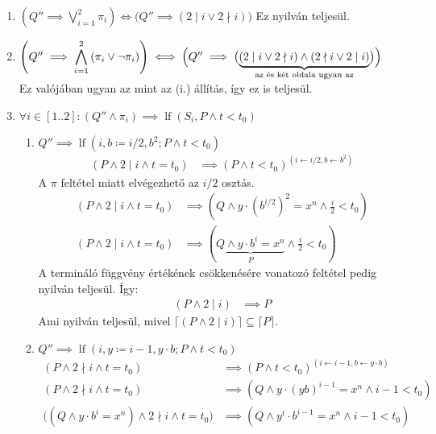 \documentclass[a4paper,12pt]{article}
\DeclareMathOperator{\lf}{lf}
\begin{document}
\begin{solution}
\begin{enumerate}
\begin{enumerate}
				\begin{enumerate}
					\item $ \left( Q'' \implies \displaystyle \bigvee_{i=1}^2{\pi_i} \right) \iff \bigl( Q'' \implies ( 2 \mid i \lor 2 \nmid i ) \bigl) $ Ez nyilván teljesül. \checkmark
					\item $ \left( Q'' \implies \displaystyle \bigwedge_{i=1}^2{(\pi_i \lor \lnot \pi_i)} \right) \iff \Bigl( Q'' \implies \bigl( \underbrace{(2 \mid i \lor 2 \nmid i) \land (2 \nmid i \lor 2 \mid i)}_{\text{az és két oldala ugyan az}} \bigr) \Bigl) $ \\ Ez valójában ugyan az mint az (i.) állítás, így ez is teljesül. \checkmark
					\item $ \forall i \in [1..2]: (Q'' \land \pi_i) \implies \lf(S_i, P \land t < t_0) $
					\begin{enumerate}
						\item $ Q'' \implies \lf(i,b \coloneq i / 2, b^2; P \land t < t_0) $
						\begin{align*}
							(P \land 2 \mid i \land t = t_0) &\implies (P \land t < t_0)^{(i \leftarrow i / 2, b \leftarrow b^2)}
						\end{align*}
						A $\pi$ feltétel miatt elvégezhető az $i/2$ osztás.
						\begin{align*}
							(P \land 2 \mid i \land t = t_0) &\implies (Q \land y \cdot (b^{i/2})^2 = x^n \land \frac{i}{2} < t_0) \\
							(P \land 2 \mid i \land t = t_0) &\implies (\underbrace{ Q \land y \cdot b^i = x^n}_{P} \land \frac{i}{2} < t_0)
						\end{align*}
						A termináló függvény értékének csökkenésére vonatozó feltétel pedig nyilván teljesül. Így:
						\begin{align*}
							(P \land 2 \mid i) &\implies P
						\end{align*}
						Ami nyilván teljesül, mivel $ \lceil (P \land 2 \mid i) \rceil \subseteq \lceil P \rceil$. \checkmark
						\item $Q'' \implies \lf(i,y \coloneq i-1, y \cdot b; P \land t < t_0) $
						\begin{align*}
							(P \land 2 \nmid i \land t = t_0) &\implies (P \land t < t_0)^{(i \leftarrow i - 1, b \leftarrow y \cdot b)} \\
							(P \land 2 \nmid i \land t = t_0) &\implies (Q \land y \cdot (yb)^{i-1} = x^n \land i - 1< t_0) \\
							\bigl( ( Q \land y \cdot b^i = x^n ) \land 2 \nmid i \land t = t_0\bigr) &\implies (Q \land y^i \cdot b^{i-1} = x^n \land i - 1< t_0)

\end{align*}
\end{enumerate}
\end{enumerate}
\end{enumerate}
\end{enumerate}
\end{solution}
\end{document}
